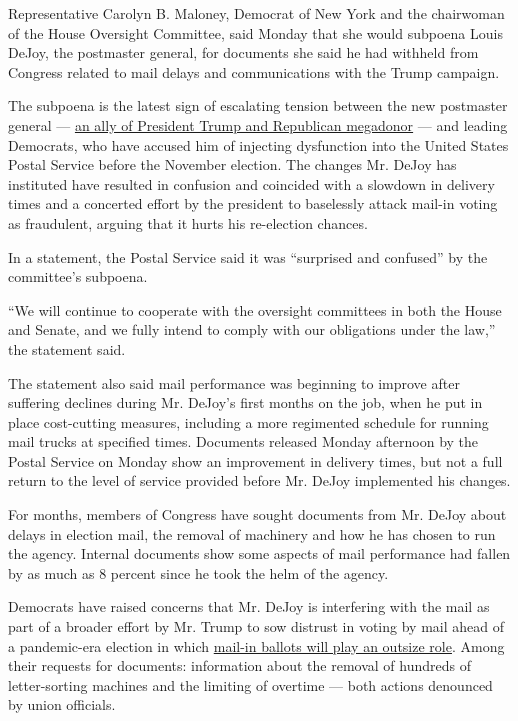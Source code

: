 Representative Carolyn B. Maloney, Democrat of New York and the
chairwoman of the House Oversight Committee, said Monday that she would
subpoena Louis DeJoy, the postmaster general, for documents she said he
had withheld from Congress related to mail delays and communications
with the Trump campaign.

The subpoena is the latest sign of escalating tension between the new
postmaster general ---
\href{https://www.nytimes3xbfgragh.onion/article/general-louis-dejoy-postmaster.html}{an
ally of President Trump and Republican megadonor} --- and leading
Democrats, who have accused him of injecting dysfunction into the United
States Postal Service before the November election. The changes Mr.
DeJoy has instituted have resulted in confusion and coincided with a
slowdown in delivery times and a concerted effort by the president to
baselessly attack mail-in voting as fraudulent, arguing that it hurts
his re-election chances.

In a statement, the Postal Service said it was ``surprised and
confused'' by the committee's subpoena.

``We will continue to cooperate with the oversight committees in both
the House and Senate, and we fully intend to comply with our obligations
under the law,'' the statement said.

The statement also said mail performance was beginning to improve after
suffering declines during Mr. DeJoy's first months on the job, when he
put in place cost-cutting measures, including a more regimented schedule
for running mail trucks at specified times. Documents released Monday
afternoon by the Postal Service on Monday show an improvement in
delivery times, but not a full return to the level of service provided
before Mr. DeJoy implemented his changes.

For months, members of Congress have sought documents from Mr. DeJoy
about delays in election mail, the removal of machinery and how he has
chosen to run the agency. Internal documents show some aspects of mail
performance had fallen by as much as 8 percent since he took the helm of
the agency.

Democrats have raised concerns that Mr. DeJoy is interfering with the
mail as part of a broader effort by Mr. Trump to sow distrust in voting
by mail ahead of a pandemic-era election in which
\href{https://www.nytimes3xbfgragh.onion/interactive/2020/08/11/us/politics/vote-by-mail-us-states.html}{mail-in
ballots will play an outsize role}. Among their requests for documents:
information about the removal of hundreds of letter-sorting machines and
the limiting of overtime --- both actions denounced by union officials.

